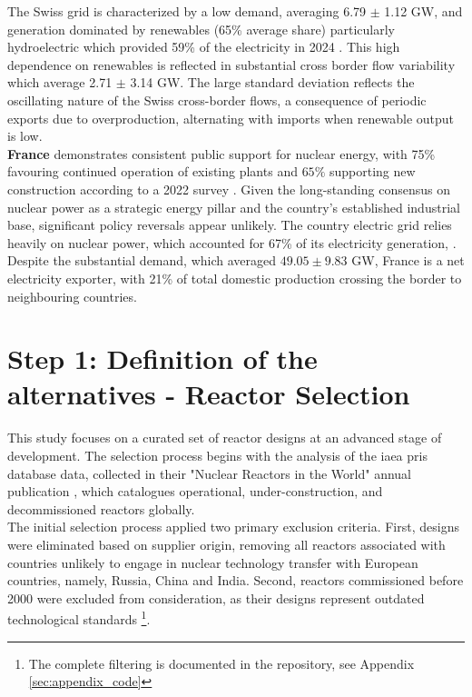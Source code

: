 The Swiss grid is characterized by a low demand, averaging 6.79 $\pm$ 1.12 GW, and generation dominated by renewables (65\% average share) particularly hydroelectric which provided 59\% of the electricity in 2024 \cite{IEA_Electricity_2024}. This high dependence on renewables is reflected in substantial cross border flow variability which average 2.71 $\pm$ 3.14 GW. The large standard deviation reflects the oscillating nature of the Swiss cross-border flows, a consequence of periodic exports due to overproduction, alternating with imports when renewable output is low.\\

\textbf{France} demonstrates consistent public support for nuclear energy, with 75\% favouring continued operation of existing plants and $65\%$ supporting new construction according to a 2022 survey \cite{IFOP_Nuclear_Perception_2023}. Given the long-standing consensus on nuclear power as a strategic energy pillar and the country's established industrial base, significant policy reversals appear unlikely. The country electric grid relies heavily on nuclear power, which accounted for 67\% of its electricity generation, \cite{IEA_Electricity_2024}. Despite the substantial demand, which averaged $49.05 \pm 9.83$ GW, France is a net electricity exporter, with 21\% of total domestic production crossing the border to neighbouring countries.

\section{Step 1: Definition of the alternatives - Reactor Selection}
\label{sec:selection_reactors}
This study focuses on a curated set of reactor designs at an advanced stage of development.
The selection process begins with the analysis of the \gls{iaea} \gls{pris} database data, collected in their "Nuclear Reactors in the World" annual publication \cite{IAEA_PRIS_2025, international2024iaea}, which catalogues operational, under-construction, and decommissioned reactors globally. \\

The initial selection process applied two primary exclusion criteria. First, designs were eliminated based on supplier origin, removing all reactors associated with countries unlikely to engage in nuclear technology transfer with European countries, namely, Russia, China and India. Second, reactors commissioned before 2000 were excluded from consideration, as their designs represent outdated technological standards \footnote{The complete filtering is documented in the repository, see Appendix \ref{sec:appendix_code}}.

